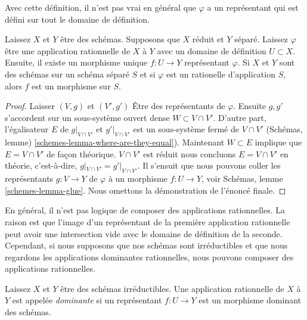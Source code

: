 \noindent
Avec cette définition, il n'est pas vrai en général que $\varphi$ a un représentant qui est défini sur tout le domaine de définition.

\begin{lemma}

\label{lemma-rational-map-from-reduced-to-separated}
Laissez $X$ et $Y$ être des schémas. Supposons que $X$ réduit et $Y$ séparé. Laissez $\varphi$ être une application rationnelle de $X$ à $Y$ avec un domaine de définition $U \subset X$. Ensuite, il existe un morphisme unique $f : U \to Y$ représentant $\varphi$. Si $X$ et $Y$ sont des schémas sur un schéma séparé $S$ et si $\varphi$ est un rationelle d'application $S$, alors $f$ est un morphisme sur $S$.
\end{lemma}

\begin{proof}

Laisser $(V, g)$ et $(V', g')$ Être des représentants de $\varphi$. Ensuite
$g, g'$ s'accordent sur un sous-système ouvert dense $W \subset V \cap V'$. D'autre part, l'égalisateur $E$ de $g|_{V \cap V'}$ et $g'|_{V \cap V'}$
est un sous-système fermé de $V \cap V'$ (Schémas, lemme)
\ref{schemes-lemma-where-are-they-equal}). Maintenant $W \subset E$
implique que $E = V \cap V'$ de façon théorique. $V \cap V'$
est réduit nous concluons $E = V \cap V'$ en théorie, c'est-à-dire,
$g|_{V \cap V'} = g'|_{V \cap V'}$. Il s'ensuit que nous pouvons coller les représentants $g : V \to Y$ de $\varphi$ à un morphisme $f : U \to Y$, voir Schémas, lemme \ref{schemes-lemma-glue}. Nous omettons la démonstration de l'énoncé finale.

\end{proof}

\noindent
En général, il n'est pas logique de composer des applications rationnelles. La raison est que l'image d'un représentant de la première application rationnelle peut avoir une intersection vide avec le domaine de définition de la seconde. Cependant, si nous supposons que nos schémas sont irréductibles et que nous regardons les applications dominantes rationnelles, nous pouvons composer des applications rationnelles.

\begin{definition}

\label{definition-dominant-rational}
Laissez $X$ et $Y$ être des schémas irréductibles. Une application rationnelle de $X$ à $Y$ est appelée {\it dominante} si un représentant $f : U \to Y$ est un morphisme dominant des schémas.
\end{definition}

